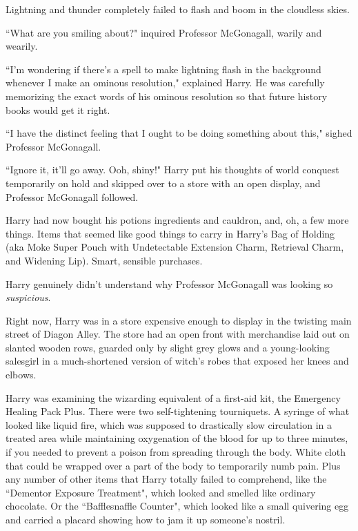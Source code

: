 Lightning and thunder completely failed to flash and boom in the cloudless skies.

``What are you smiling about?" inquired Professor McGonagall, warily and wearily.

``I'm wondering if there's a spell to make lightning flash in the background whenever I make an ominous resolution," explained Harry. He was carefully memorizing the exact words of his ominous resolution so that future history books would get it right.

``I have the distinct feeling that I ought to be doing something about this," sighed Professor McGonagall.

``Ignore it, it'll go away. Ooh, shiny!" Harry put his thoughts of world conquest temporarily on hold and skipped over to a store with an open display, and Professor McGonagall followed.

\later

Harry had now bought his potions ingredients and cauldron, and, oh, a few more things. Items that seemed like good things to carry in Harry's Bag of Holding (aka Moke Super Pouch  with Undetectable Extension Charm, Retrieval Charm, and Widening Lip). Smart, sensible purchases.

Harry genuinely didn't understand why Professor McGonagall was looking so \emph{suspicious}.

Right now, Harry was in a store expensive enough to display in the twisting main street of Diagon Alley. The store had an open front with merchandise laid out on slanted wooden rows, guarded only by slight grey glows and a young-looking salesgirl in a much-shortened version of witch's robes that exposed her knees and elbows.

Harry was examining the wizarding equivalent of a first-aid kit, the Emergency Healing Pack Plus. There were two self-tightening tourniquets. A syringe of what looked like liquid fire, which was supposed to drastically slow circulation in a treated area while maintaining oxygenation of the blood for up to three minutes, if you needed to prevent a poison from spreading through the body. White cloth that could be wrapped over a part of the body to temporarily numb pain. Plus any number of other items that Harry totally failed to comprehend, like the ``Dementor Exposure Treatment", which looked and smelled like ordinary chocolate. Or the ``Bafflesnaffle Counter", which looked like a small quivering egg and carried a placard showing how to jam it up someone's nostril.

